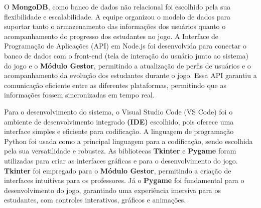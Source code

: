 O \textbf{MongoDB}, como banco de dados não relacional foi escolhido pela sua flexibilidade e escalabilidade. A equipe organizou o modelo de dados para suportar tanto o armazenamento das informações dos usuários quanto o acompanhamento do progresso dos estudantes no jogo. A Interface de Programação de Aplicações (API) em Node.js foi desenvolvida para conectar o banco de dados com o front-end (tela de interação do usuário junto ao sistema) do jogo e o \textbf{Módulo Gestor}, permitindo a atualização de perfis de usuários e o acompanhamento da evolução dos estudantes durante o jogo. Essa API garantiu a comunicação eficiente entre as diferentes plataformas, permitindo que as informações fossem sincronizadas em tempo real.

Para o desenvolvimento do sistema, o Visual Studio Code (VS Code) foi o ambiente de desenvolvimento integrado \textbf{(IDE)} escolhido, pois oferece uma interface simples e eficiente para codificação. A linguagem de programação Python foi usada como a principal linguagem para a codificação, sendo escolhida pela sua versatilidade e robustez. As bibliotecas \textbf{Tkinter} e \textbf{Pygame} foram utilizadas para criar as interfaces gráficas e para o desenvolvimento do jogo. \textbf{Tkinter} foi empregado para o \textbf{Módulo Gestor}, permitindo a criação de interfaces intuitivas para os professores. Já o \textbf{Pygame} foi fundamental para o desenvolvimento do jogo, garantindo uma experiência imersiva para os estudantes, com controles interativos, gráficos e animações.
